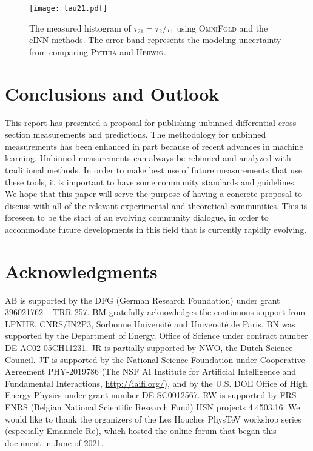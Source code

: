 \documentclass[a4paper,11pt]{article}
\begin{document}
\begin{figure}[h!]
\centering
\texttt{[image: tau21.pdf]}
  \caption{The measured histogram of $\tau_{21}=\tau_2/\tau_1$ using \textsc{OmniFold} and the cINN methods.  The error band represents the modeling uncertainty from comparing \textsc{Pythia} and \textsc{Herwig}.}
    \label{fig:ratio}
\end{figure}

	

\clearpage

\section{Conclusions and Outlook}
\label{sec:conclusion}

This report has presented a proposal for publishing unbinned differential cross section measurements and predictions.  The methodology for unbinned measurements has been enhanced in part because of recent advances in machine learning.  Unbinned measurements can always be rebinned and analyzed with traditional methods.  In order to make best use of future measurements that use these tools, it is important to have some community standards and guidelines.  We hope that this paper will serve the purpose of having a concrete proposal to discuss with all of the relevant experimental and theoretical communities.  This is foreseen to be the start of an evolving community dialogue, in order to accommodate future developments in this field that is currently rapidly evolving.

\section*{\label{sec::acknowledgments}Acknowledgments}

AB is supported by the DFG (German Research Foundation) under grant 396021762 – TRR 257.
%
BM gratefully acknowledges the continuous support from LPNHE, CNRS/IN2P3, Sorbonne Universit\'e and Universit\'e de Paris.
%
BN was supported by the Department of Energy, Office of Science under contract number DE-AC02-05CH11231.
%
JR is partially supported by NWO, the 
Dutch Science Council.
%
JT is supported by the National Science Foundation under Cooperative Agreement PHY-2019786 (The NSF AI Institute for Artificial Intelligence and Fundamental Interactions, \url{http://iaifi.org/}), and by the U.S. DOE Office of High Energy Physics under grant number DE-SC0012567.
%
RW is supported by FRS-FNRS (Belgian National Scientific Research Fund) IISN
projects 4.4503.16.
%
We would like to thank the organizers of the Les Houches PhysTeV workshop series (especially Emanuele Re), which hosted the online forum that began this document in June of 2021.



\end{document}
